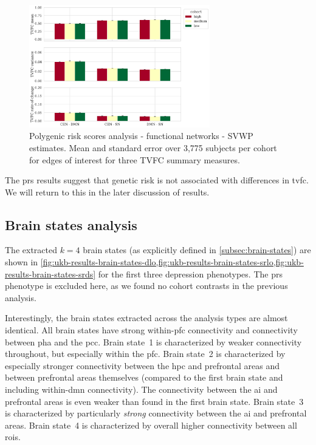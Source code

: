 \begin{figure}[h]
  \centering
  \includegraphics[width=0.7\textwidth]{fig/ukbiobank/TVFC_predictions_summaries/pgs/cohort_comparison/FN/correlation_all_TVFC_summary_measures_SVWP_joint_edges_of_interest}
  \caption{
    Polygenic risk scores analysis - functional networks - SVWP estimates.
    Mean and standard error over 3,775 subjects per cohort for edges of interest for three TVFC summary measures.
  }\label{fig:ukb-results-pgs-fn-cohort-comparison-edges-of-interest-wp}
\end{figure}


The \gls{prs} results suggest that genetic risk is not associated with differences in \gls{tvfc}.
We will return to this in the later discussion of results.

\clearpage
\subsection{Brain states analysis}

The extracted $k = 4$ brain states (as explicitly defined in \cref{subsec:brain-states}) are shown in \cref{fig:ukb-results-brain-states-dlo,fig:ukb-results-brain-states-srlo,fig:ukb-results-brain-states-srds} for the first three depression phenotypes.
The \gls{prs} phenotype is excluded here, as we found no cohort contrasts in the previous analysis.

Interestingly, the brain states extracted across the analysis types are almost identical.
All brain states have strong within-\gls{pfc} connectivity and connectivity between \gls{pha} and the \gls{pcc}.
%
Brain state~1 is characterized by weaker connectivity throughout, but especially within the \gls{pfc}.
%
Brain state~2 is characterized by especially stronger connectivity between the \gls{hpc} and prefrontal areas and between prefrontal areas themselves (compared to the first brain state and including within-\gls{dmn} connectivity).
The connectivity between the \gls{ai} and prefrontal areas is even weaker than found in the first brain state.
%
Brain state~3 is characterized by particularly \emph{strong} connectivity between the \gls{ai} and prefrontal areas.
%
Brain state~4 is characterized by overall higher connectivity between all \glspl{roi}.


